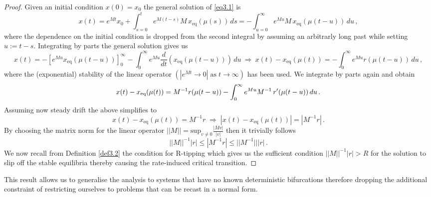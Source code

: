 \documentclass[../main.tex]{subfiles}
\begin{document}
\begin{proof}
     Given an initial condition $x(0)=x_{0}$ the general solution of \eqref{eq3.1} is
     \begin{equation*}
         x(t) = e^{Mt}x_{0}+\int_{s=0}^{t}e^{M(t-s)}M\,x_{\text{eq}}(\mu(s))\,ds = - \int_{u=0}^{\infty}e^{Mu}M\,x_{\text{eq}}(\mu(t-u))\,du\,,
     \end{equation*}
     where the dependence on the initial condition is dropped from the second integral by assuming an arbitrarly long past while setting $u:=t-s$. Integrating by parts the general solution gives us
     \begin{equation*}
             x(t) = -[e^{Mu}x_{\text{eq}}(\mu(t-u))]_{0}^{\infty} - \int_{0}^{\infty}e^{Mu}\frac{d}{dt}(x_{\text{eq}}(\mu(t-u)))\,du\:\Rightarrow\: x(t) - x_{\text{eq}}(\mu(t)) = -\int_{0}^{\infty}e^{Mu}r(\mu(t-u))\,du\,,
     \end{equation*}
     where the (exponential) stability of the linear operator $(|e^{Mt}\to0|\;\text{as}\; t\to \infty)$ has been used. We integrate by parts again and obtain 
     \begin{equation*}
         x(t) - x_{\text{eq}}(\mu(t)) = M^{-1}r(\mu(t-u))-\int_{0}^{\infty}e^{Mu}M^{-1}\,r'(\mu(t-u))\,du\,.
     \end{equation*}
     Assuming now steady drift the above simplifies to
     \begin{equation*}
         x(t) - x_{\text{eq}}(\mu(t)) = M^{-1}r\;\Rightarrow\;|x(t) - x_{\text{eq}}(\mu(t))| = |M^{-1}r|\,.
     \end{equation*}
     By choosing the matrix norm for the linear operator $||M||=\text{sup}_{v\neq0}\frac{|Mv|}{|v|}$ then it trivially follows
     \begin{equation*}
         ||M||^{-1}|r|\leq|M^{-1}r|\leq||M^{-1}|||r|\,.
     \end{equation*}
     We now recall from Definition \ref{def3.2} the condition for R-tipping which gives us the sufficient condition $||M||^{-1}|r|>R$ for the solution to slip off the stable equilibria thereby causing the rate-induced critical transition.
\end{proof}
This result allows us to generalise the analysis to systems that have no known deterministic bifurcations therefore dropping the additional constraint of restricting ourselves to problems that can be recast in a normal form.
\end{document}

